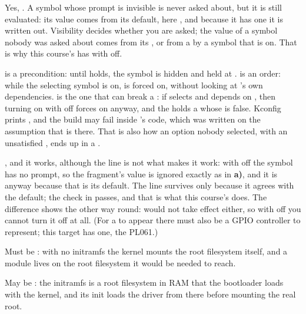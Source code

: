  Yes, . A symbol whose prompt is invisible is never asked about,
but it is still evaluated: its value comes from its default, here , and because it has one
it is written out. Visibility decides whether you are asked; the value of a symbol nobody was asked
about comes from its , or from a  by a symbol that is on. That is why
this course's  has  with  off.

  is a precondition: until  holds, the symbol is hidden and
held at .  is an order: while the selecting symbol is on,  is forced
on, without looking at 's own dependencies. \textbf{} is the one that can break
a : if  selects  and  depends on , then turning on
 with  off forces  on anyway, and the  holds a  whose
 is false. Kconfig prints , and the build may fail inside 's code, which was written on the assumption that 
is there. That is also how an option nobody selected, with an unsatisfied , ends
up in a .

 , and it works, although the line is not what makes it work: with
 off the symbol has no prompt, so the fragment's value is ignored exactly as in
\textbf{a)}, and it is  anyway because that is its default. The line survives
 only because it agrees with the default; the check in 
passes, and that is what this course's  does. The difference shows the
other way round:  would not take effect either, so with
 off you cannot turn it off at all. (For a  to appear there must
also be a GPIO controller to represent; this target has one, the PL061.)


 Must be : with no initramfs the kernel mounts the root filesystem itself, and a
module lives on the root filesystem it would be needed to reach.

 May be : the initramfs is a root filesystem in RAM that the bootloader loads
with the kernel, and its init loads the driver from there before mounting the real root.

